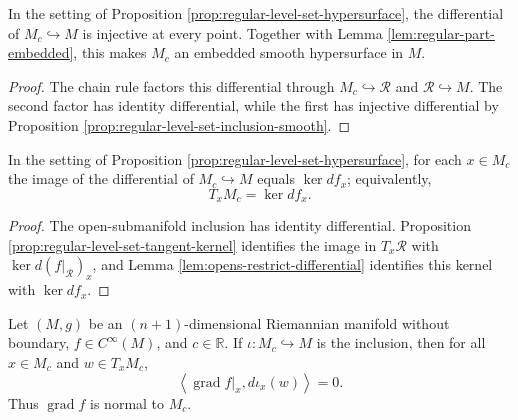 \begin{lemma}
\label{lem:regular-part-inclusion-immersion}
\leanok
{}
In the setting of Proposition \ref{prop:regular-level-set-hypersurface}, the
differential of $M_c\hookrightarrow M$ is injective at every point. Together with
Lemma \ref{lem:regular-part-embedded}, this makes $M_c$ an embedded smooth
hypersurface in $M$.
\end{lemma}

\begin{proof}
\leanok
{}
\sketch The chain rule factors this differential through $M_c\hookrightarrow\mathcal R$
and $\mathcal R\hookrightarrow M$. The second factor has identity differential,
while the first has injective differential by Proposition
\ref{prop:regular-level-set-inclusion-smooth}.
\end{proof}

\begin{lemma}
\label{lem:regular-part-tangent-kernel}
\leanok
{}
In the setting of Proposition \ref{prop:regular-level-set-hypersurface}, for each
$x\in M_c$ the image of the differential of $M_c\hookrightarrow M$ equals
$\ker df_x$; equivalently,
\[
T_xM_c=\ker df_x.
\]
\end{lemma}

\begin{proof}
\leanok
{}
\sketch The open-submanifold inclusion has identity differential. Proposition
\ref{prop:regular-level-set-tangent-kernel} identifies the image in $T_x\mathcal R$
with $\ker d(f|_{\mathcal R})_x$, and Lemma
\ref{lem:opens-restrict-differential} identifies this kernel with $\ker df_x$.
\end{proof}

\begin{proposition}
\label{prop:gradient-normal-regular-part}
\leanok
{}
Let $(M,g)$ be an $(n+1)$-dimensional Riemannian manifold without boundary,
$f\in C^\infty(M)$, and $c\in\mathbb R$. If $\iota\colon M_c\hookrightarrow M$ is
the inclusion, then for all $x\in M_c$ and $w\in T_xM_c$,
\[
\left\langle\operatorname{grad}f|_x,d\iota_x(w)\right\rangle=0.
\]
Thus $\operatorname{grad}f$ is normal to $M_c$.
\end{proposition}

